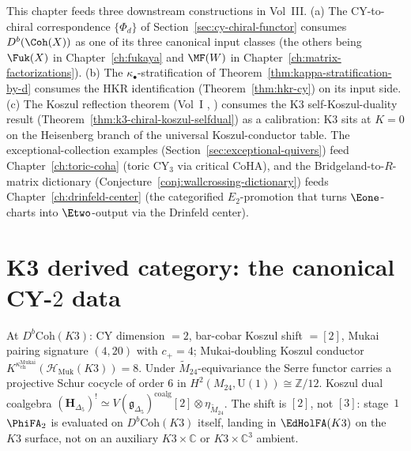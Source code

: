 \begin{remark}
\label{rem:cross-chapter}
This chapter feeds three downstream constructions in Vol~III. (a) The CY-to-chiral correspondence $\{\Phi_d\}$ of Section~\ref{sec:cy-chiral-functor} consumes $D^b(\Coh(X))$ as one of its three canonical input classes (the others being $\Fuk(X)$ in Chapter~\ref{ch:fukaya} and $\MF(W)$ in Chapter~\ref{ch:matrix-factorizations}). (b) The $\kappa_\bullet$-stratification of Theorem~\ref{thm:kappa-stratification-by-d} consumes the HKR identification (Theorem~\ref{thm:hkr-cy}) on its input side. (c) The Koszul reflection theorem (Vol~I \cite{VolI}, \cite{VolI}) consumes the K3 self-Koszul-duality result (Theorem~\ref{thm:k3-chiral-koszul-selfdual}) as a calibration: K3 sits at $K = 0$ on the Heisenberg branch of the universal Koszul-conductor table. The exceptional-collection examples (Section~\ref{sec:exceptional-quivers}) feed Chapter~\ref{ch:toric-coha} (toric CY$_3$ via critical CoHA), and the Bridgeland-to-$R$-matrix dictionary (Conjecture~\ref{conj:wallcrossing-dictionary}) feeds Chapter~\ref{ch:drinfeld-center} (the categorified $E_2$-promotion that turns $\Eone$-charts into $\Etwo$-output via the Drinfeld center).
\end{remark}

\section{K3 derived category: the canonical CY-\texorpdfstring{$2$}{2} data}
\label{sec:dcy-k3-cy2-canonical}

\begin{remark}
\label{rem:dcy-k3-cy2-shift}
At $D^b\mathrm{Coh}(K3)$: CY dimension $= 2$, bar-cobar Koszul shift $= [2]$, Mukai pairing signature $(4, 20)$ with $c_+ = 4$; Mukai-doubling Koszul conductor $K^{\kappa_{\mathrm{ch}}^{\mathrm{Mukai}}}(\mathcal{H}_{\mathrm{Muk}}(K3)) = 8$. Under $\widetilde{M}_{24}$-equivariance the Serre functor carries a projective Schur cocycle of order $6$ in $H^2(M_{24}, \mathrm{U}(1)) \cong \mathbb{Z}/12$. Koszul dual coalgebra $(\mathbf{H}_{\Delta_5})^! \simeq V(\mathfrak{g}_{\Delta_5})^{\mathrm{coalg}}[2] \otimes \eta_{\widetilde{M}_{24}}$. The shift is $[2]$, not $[3]$: stage~$1$ $\PhiFA_2$ is evaluated on $D^b\mathrm{Coh}(K3)$ itself, landing in $\EdHolFA(K3)$ on the $K3$ surface, not on an auxiliary $K3 \times \mathbb{C}$ or $K3 \times \mathbb{C}^3$ ambient.
\end{remark}

